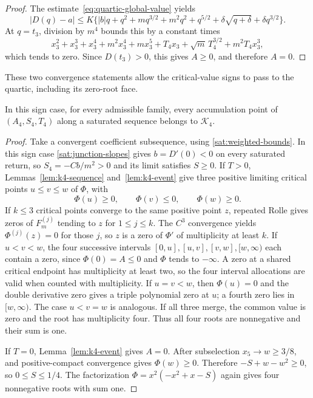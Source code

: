 \begin{proof}
The estimate~\eqref{eq:quartic-global-value} yields
\[
 |D(q)-a|\le K\{|b|q+q^2+mq^{3/2}+m^2q^2+q^{5/2}
                +\delta\sqrt{q+\delta}+\delta q^{3/2}\}.
\]
At $q=t_3$, division by $m^4$ bounds this by a constant times
\[
 x_3^2+x_3^3+x_3^4+m^2x_3^4+mx_3^5
 +T_4x_3+\sqrt m\,T_4^{3/2}+m^2T_4x_3^3,
\]
which tends to zero. Since $D(t_3)>0$, this gives $A\ge0$, and therefore
$A=0$.
\end{proof}

These two convergence statements allow the critical-value signs to pass
to the quartic, including its zero-root face.

\begin{proposition}\label{prop:k4-necessary}
In this sign case, for every admissible family, every accumulation point of
$(A_4,S_4,T_4)$ along a saturated sequence belongs to $\mathcal K_4$.
\end{proposition}
\begin{proof}
Take a convergent coefficient subsequence, using \eqref{sat:weighted-bounds}.
In this sign case \eqref{sat:junction-slopes} gives $b=D'(0)<0$ on every
saturated return, so $S_4=-Cb/m^2>0$ and its limit satisfies $S\ge0$.
If $T>0$, Lemmas~\ref{lem:k4-sequence} and~\ref{lem:k4-event} give three
positive limiting critical points $u\le v\le w$ of $\Phi$, with
\[
 \Phi(u)\ge0,\qquad\Phi(v)\le0,\qquad\Phi(w)\ge0.
\]
If $k\le3$ critical points converge to the same positive point $z$,
repeated Rolle gives zeros of $F_m^{(j)}$ tending to $z$ for
$1\le j\le k$. The $C^3$ convergence yields $\Phi^{(j)}(z)=0$ for
those $j$, so $z$ is a zero of $\Phi'$ of multiplicity at least $k$.
If $u<v<w$, the four successive intervals
$[0,u],[u,v],[v,w],[w,\infty)$ each contain a zero, since $\Phi(0)=A\le0$
and $\Phi$ tends to $-\infty$. A zero at a shared critical endpoint has
multiplicity at least two, so the four interval allocations are valid
when counted with multiplicity. If $u=v<w$, then $\Phi(u)=0$ and the
double derivative zero gives a triple polynomial zero at $u$; a fourth
zero lies in $[w,\infty)$. The case $u<v=w$ is analogous. If all three
merge, the common value is zero and the root has multiplicity four.
Thus all four roots are nonnegative and their sum is one.

If $T=0$, Lemma~\ref{lem:k4-event} gives $A=0$. After subselection $x_5\to w\ge3/8$,
and positive-compact convergence gives $\Phi(w)\ge0$. Therefore
$-S+w-w^2\ge0$, so $0\le S\le1/4$. The factorization
$\Phi=x^2(-x^2+x-S)$ again gives four nonnegative roots with sum one.
\end{proof}

